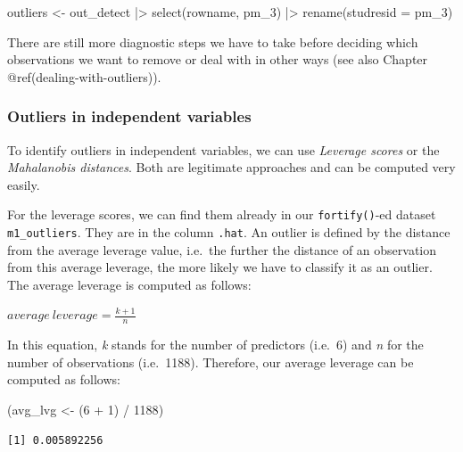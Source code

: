 \documentclass[
  letterpaper,
]{krantz}
\makeatletter
\newenvironment{Shaded}{\begin{snugshade}}{\end{snugshade}}
\newcommand{\AttributeTok}[1]{\textcolor[rgb]{0.40,0.45,0.13}{#1}}
\newcommand{\DecValTok}[1]{\textcolor[rgb]{0.68,0.00,0.00}{#1}}
\newcommand{\FunctionTok}[1]{\textcolor[rgb]{0.28,0.35,0.67}{#1}}
\newcommand{\NormalTok}[1]{\textcolor[rgb]{0.00,0.23,0.31}{#1}}
\newcommand{\OtherTok}[1]{\textcolor[rgb]{0.00,0.23,0.31}{#1}}
\newcommand{\SpecialCharTok}[1]{\textcolor[rgb]{0.37,0.37,0.37}{#1}}
\newenvironment{kframe}{%
\medskip{}
\setlength{\fboxsep}{.8em}
 \def\at@end@of@kframe{}%
 \ifinner\ifhmode%
  \def\at@end@of@kframe{\end{minipage}}%
  \begin{minipage}{\columnwidth}%
 \fi\fi%
 \def\FrameCommand##1{\hskip\@totalleftmargin \hskip-\fboxsep
 \colorbox{shadecolor}{##1}\hskip-\fboxsep
     \hskip-\linewidth \hskip-\@totalleftmargin \hskip\columnwidth}%
 \MakeFramed {\advance\hsize-\width
   \@totalleftmargin\z@ \linewidth\hsize
   \@setminipage}}%
 {\par\unskip\endMakeFramed%
 \at@end@of@kframe}
\renewenvironment{Shaded}{\begin{kframe}}{\end{kframe}}
\makeatother
\begin{document}
\begin{Shaded}
\begin{Highlighting}[]
\NormalTok{outliers }\OtherTok{\textless{}{-}}
\NormalTok{  out\_detect }\SpecialCharTok{|\textgreater{}}
  \FunctionTok{select}\NormalTok{(rowname, pm\_3) }\SpecialCharTok{|\textgreater{}}
  \FunctionTok{rename}\NormalTok{(}\AttributeTok{studresid =}\NormalTok{ pm\_3)}
\end{Highlighting}
\end{Shaded}

There are still more diagnostic steps we have to take before deciding
which observations we want to remove or deal with in other ways (see
also Chapter @ref(dealing-with-outliers)).

\subsubsection{Outliers in independent
variables}\label{sec-outliers-in-the-independent-variables}

To identify outliers in independent variables, we can use \emph{Leverage
scores} or the \emph{Mahalanobis distances}. Both are legitimate
approaches and can be computed very easily.

For the leverage scores, we can find them already in our
\texttt{fortify()}-ed dataset \texttt{m1\_outliers}. They are in the
column \texttt{.hat}. An outlier is defined by the distance from the
average leverage value, i.e.~the further the distance of an observation
from this average leverage, the more likely we have to classify it as an
outlier. The average leverage is computed as follows:

\label{average-leverage-equation}
\(average\ leverage = \frac{k + 1}{n}\)

In this equation, \emph{k} stands for the number of predictors (i.e.~6)
and \emph{n} for the number of observations (i.e.~1188). Therefore, our
average leverage can be computed as follows:

\begin{Shaded}
\begin{Highlighting}[]
\NormalTok{(avg\_lvg }\OtherTok{\textless{}{-}}\NormalTok{ (}\DecValTok{6} \SpecialCharTok{+} \DecValTok{1}\NormalTok{) }\SpecialCharTok{/} \DecValTok{1188}\NormalTok{)}
\end{Highlighting}
\end{Shaded}

\begin{verbatim}
[1] 0.005892256
\end{verbatim}
\end{document}

